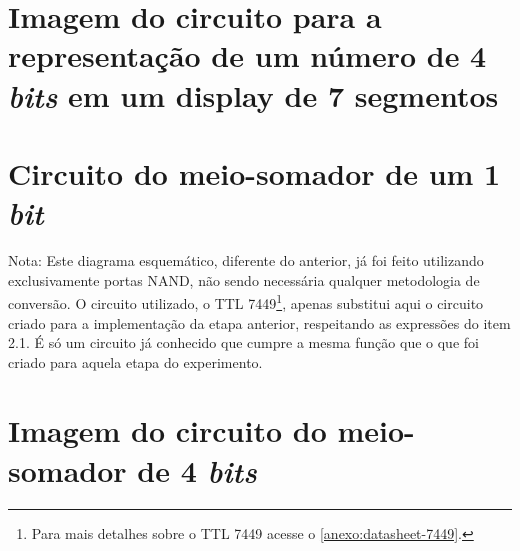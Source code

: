 
\begin{apendicesenv}

\partapendices

\chapter{Imagem do circuito para a representação de um número de 4 \textit{bits} em um display de 7 segmentos}
	\label{apendice:CircuitoEtapa1}
	

	\chapter{Circuito do meio-somador de um 1 \textit{bit}}
		\label{apendice:CircuitoEtapa2}
		

		Nota: Este diagrama esquemático, diferente do anterior, já foi feito
		utilizando exclusivamente portas NAND, não sendo necessária qualquer metodologia de conversão.
		O circuito utilizado, o TTL 7449\footnote{Para mais detalhes sobre o TTL 7449 acesse o \autoref{anexo:datasheet-7449}.}, apenas substitui aqui o circuito criado para a implementação
		da etapa anterior, respeitando as expressões do item 2.1. É só um circuito já conhecido que
		cumpre a mesma função que o que foi criado para aquela etapa do experimento.

\chapter{Imagem do circuito do meio-somador de 4 \textit{bits}}
	



\end{apendicesenv}
